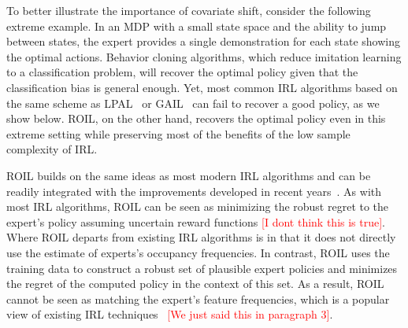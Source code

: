 \documentclass[11pt]{uai2023}
\newcommand{\gersi}[1]{\textcolor{red}{[#1]}}
\begin{document}
To better illustrate the importance of covariate shift, consider the following extreme example. In an MDP with a small state space and the ability to jump between states, the expert provides a single demonstration for each state showing the optimal actions. Behavior cloning algorithms, which reduce imitation learning to a classification problem, will recover the optimal policy given that the classification bias is general enough. Yet, most common IRL algorithms based on the same scheme as LPAL~\cite{Syed2008} or GAIL~\cite{Ho2016} can fail to recover a good policy, as we show below. ROIL, on the other hand, recovers the optimal policy even in this extreme setting while preserving most of the benefits of the low sample complexity of IRL.



ROIL builds on the same ideas as most modern IRL algorithms and can be readily integrated with the improvements developed in recent years~\cite{Arora2020}. As with most IRL algorithms, ROIL can be seen as minimizing the robust regret to the expert's policy assuming uncertain reward functions \gersi{I dont think this is true}. Where ROIL departs from existing IRL algorithms is in that it does not directly use the estimate of experts's occupancy frequencies. In contrast, ROIL uses the training data to construct a robust set of plausible expert policies and minimizes the regret of the computed policy in the context of this set. As a result, ROIL cannot be seen as matching the expert's feature frequencies, which is a popular view of existing IRL techniques~\cite{abbeel2004,Syed2008,Ho2016} \gersi{We just said this in paragraph 3}. 

\end{document}
